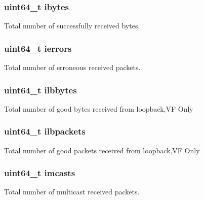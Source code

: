 \subsubsection[{ibytes}]{\setlength{\rightskip}{0pt plus 5cm}uint64\+\_\+t ibytes}\label{structrte__eth__stats_a90c25a10d1e2ab583f03f6c5237563c0}
Total number of successfully received bytes. \hypertarget{structrte__eth__stats_aa4f59b58c69cf6d99f2bdfcad48c5774}{}
\subsubsection[{ierrors}]{\setlength{\rightskip}{0pt plus 5cm}uint64\+\_\+t ierrors}\label{structrte__eth__stats_aa4f59b58c69cf6d99f2bdfcad48c5774}
Total number of erroneous received packets. \hypertarget{structrte__eth__stats_acbe9b5f40d03077d02c14f87a0f260d6}{}
\subsubsection[{ilbbytes}]{\setlength{\rightskip}{0pt plus 5cm}uint64\+\_\+t ilbbytes}\label{structrte__eth__stats_acbe9b5f40d03077d02c14f87a0f260d6}
Total number of good bytes received from loopback,V\+F Only \hypertarget{structrte__eth__stats_ac5547c65328b65565b8fa8f65e36f10e}{}
\subsubsection[{ilbpackets}]{\setlength{\rightskip}{0pt plus 5cm}uint64\+\_\+t ilbpackets}\label{structrte__eth__stats_ac5547c65328b65565b8fa8f65e36f10e}
Total number of good packets received from loopback,V\+F Only \hypertarget{structrte__eth__stats_a9cb6910614279200341f56d2a2ec03cb}{}
\subsubsection[{imcasts}]{\setlength{\rightskip}{0pt plus 5cm}uint64\+\_\+t imcasts}\label{structrte__eth__stats_a9cb6910614279200341f56d2a2ec03cb}
Total number of multicast received packets. \hypertarget{structrte__eth__stats_a462703bfeca72b2d1039f588d8ddbf3c}{}
